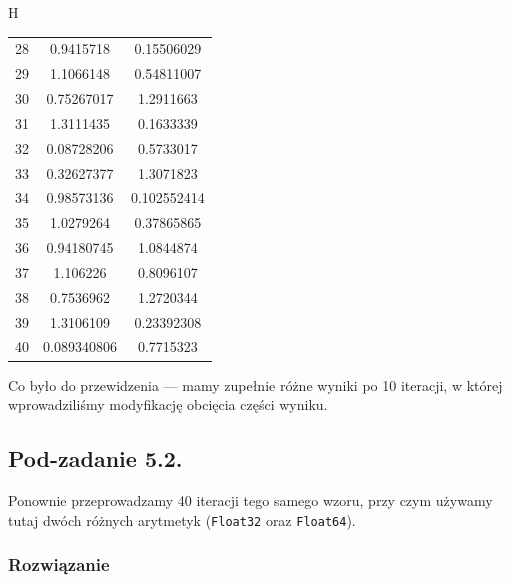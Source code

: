 \documentclass[10pt]{article}
\begin{document}
\begin{center}{H}
\begin{tabular}{|c| c c |}
        28 & 0.9415718 & 0.15506029\\
        29 & 1.1066148 & 0.54811007\\
        30 & 0.75267017 & 1.2911663\\
        31 & 1.3111435 & 0.1633339\\
        32 & 0.08728206 & 0.5733017\\
        33 & 0.32627377 & 1.3071823\\
        34 & 0.98573136 & 0.102552414\\
        35 & 1.0279264 & 0.37865865\\
        36 & 0.94180745 & 1.0844874\\
        37 & 1.106226 & 0.8096107\\
        38 & 0.7536962 & 1.2720344\\
        39 & 1.3106109 & 0.23392308\\
        40 & 0.089340806 & 0.7715323\\
    \hline
    \end{tabular}
\end{center}

Co było do przewidzenia — mamy zupełnie różne wyniki po 10 iteracji, w której wprowadziliśmy modyfikację obcięcia części wyniku.

\subsection{Pod-zadanie 5.2.}
Ponownie przeprowadzamy 40 iteracji tego samego wzoru, przy czym używamy tutaj dwóch różnych arytmetyk (\texttt{Float32} oraz \texttt{Float64}).

\subsubsection{Rozwiązanie}
\end{document}
